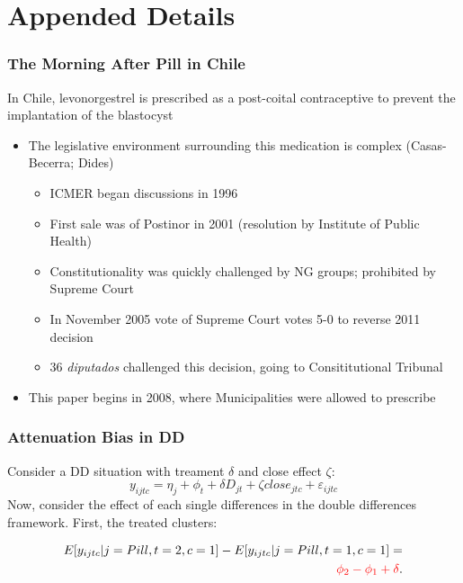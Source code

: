 \documentclass[10pt,letterpaper,subeqn]{beamer}
\begin{document}
\frame{
\textcolor{blue}{Thank you.}
}

\section{Appended Details}

\begin{frame}[label=PAE]
\frametitle{The Morning After Pill in Chile}
In Chile, levonorgestrel is prescribed as a post-coital contraceptive to prevent the implantation
of the blastocyst\\
\vspace{5mm}
\begin{itemize}
\item The legislative environment surrounding this medication is complex (Casas-Becerra; Dides)
\begin{itemize}
\item ICMER began discussions in 1996
\item First sale was of Postinor in 2001 (resolution by Institute of Public Health)
\item Constitutionality was quickly challenged by NG groups; prohibited by Supreme Court
\item In November 2005 vote of Supreme Court votes 5-0 to reverse 2011 decision
\item 36 \emph{diputados} challenged this decision, going to Consititutional Tribunal
\end{itemize}
\item This paper begins in 2008, where Municipalities were allowed to prescribe
\end{itemize}
\hyperlink{Context}{}
\end{frame}

\begin{frame}[label=sumR]

\hyperlink{sum}{}
\end{frame}

\begin{frame}[label=demonstrate]
\frametitle{Attenuation Bias in DD}
Consider a DD situation with treament $\delta$ and close effect $\zeta$:
\begin{equation}
 \label{TEENeqn:DDa1}
 y_{ijtc} = \eta_j + \phi_t + \delta D_{jt} + \zeta close_{jtc} + 
\varepsilon_{ijtc}
\end{equation}
\vspace{1cm}
Now, consider the effect of each single differences in the double differences
framework.  First, the treated clusters:

\begin{eqnarray}
\label{TEENeqn:diftreat}
\nonumber
 E[y_{ijtc}|j=Pill,t=2,c=1]-E[y_{ijtc}|j=Pill,t=1,c=1] = \\ \nonumber
 \textcolor{red}{\phi_2-\phi_1+\delta}.
\end{eqnarray}
\end{frame}
\end{document}
